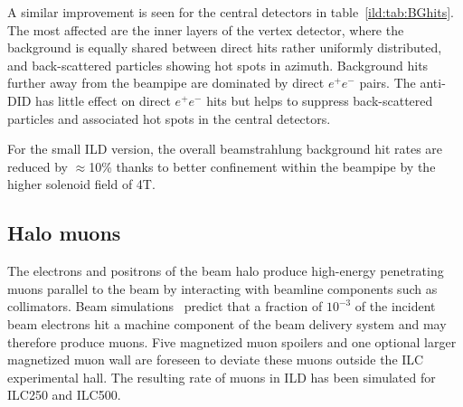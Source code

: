 A similar improvement is seen for the central detectors in table~\ref{ild:tab:BGhits}. The most affected are the inner layers of the vertex detector, where the background is equally shared between direct hits rather uniformly distributed, and back-scattered particles showing hot spots in azimuth. Background hits further away from the beampipe are dominated by direct $e^+e^-$ pairs. The anti-DID has little effect on direct $e^+e^-$ hits but helps to suppress back-scattered particles and associated hot spots in the central detectors.

For the small ILD version, the overall beamstrahlung background hit rates are reduced by $\approx$10\%  thanks to better confinement within the beampipe by the higher solenoid field of 4T.



\subsection{Halo muons}

The electrons and positrons of the beam halo produce high-energy penetrating muons parallel to the beam by interacting with beamline components such as collimators. Beam simulations~\cite{Keller:2019aak} predict that a fraction of $10^{-3}$ of the incident beam electrons hit a machine component of the beam delivery system and may therefore produce muons. Five magnetized muon spoilers and one optional larger magnetized muon wall are foreseen to deviate these muons outside the ILC experimental hall. The resulting rate of muons in ILD has been simulated for ILC250 and ILC500. 

